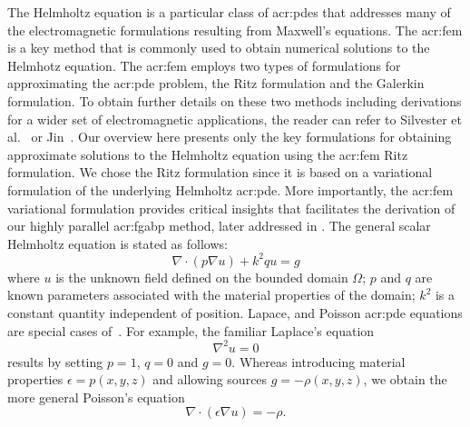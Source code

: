 The Helmholtz equation is a particular class of \glspl{acr:pde} that addresses many of the electromagnetic formulations resulting from Maxwell's equations.
The \gls{acr:fem} is a key method that is commonly used to obtain numerical solutions to the Helmhotz equation.
The \gls{acr:fem} employs two types of formulations for approximating the \gls{acr:pde} problem, the Ritz formulation and the Galerkin formulation.
To obtain further details on these two methods including derivations for a wider set of electromagnetic applications, the reader can refer to Silvester et al.~\cite{bib:Silvester1996FEEE} or Jin~\cite{bib:Jin2002TFEMIE}.
Our overview here presents only the key formulations for obtaining approximate solutions to the Helmholtz equation using the \gls{acr:fem} Ritz formulation.
We chose the Ritz formulation since it is based on a variational formulation of the underlying Helmholtz \gls{acr:pde}.
More importantly, the \gls{acr:fem} variational formulation provides critical insights that facilitates the derivation of our highly parallel \gls{acr:fgabp} method, later addressed in .
The general scalar Helmholtz equation is stated as follows:
\begin{equation}
	\nabla\cdot\left(p\nabla u\right)+k^2 q u=g
	\label{eqn:bvp}
\end{equation}
where $u$ is the unknown field defined on the bounded domain $\Omega$; $p$ and $q$ are known parameters associated with the material properties of the domain; $k^2$ is a constant quantity independent of position.
Lapace, and Poisson \gls{acr:pde} equations are special cases of~.
For example, the familiar Laplace's equation
\begin{equation}
	\nabla^2 u = 0
	\label{eqn:lap}
\end{equation}
results by setting $p=1$, $q=0$ and $g=0$.
Whereas introducing material properties $\epsilon = p(x,y,z)$ and allowing sources $g=-\rho(x,y,z)$, we obtain the more general Poisson's equation
\begin{equation}
	\nabla\cdot\left(\epsilon\nabla u\right) = -\rho.
	\label{eqn:pss}
\end{equation}


